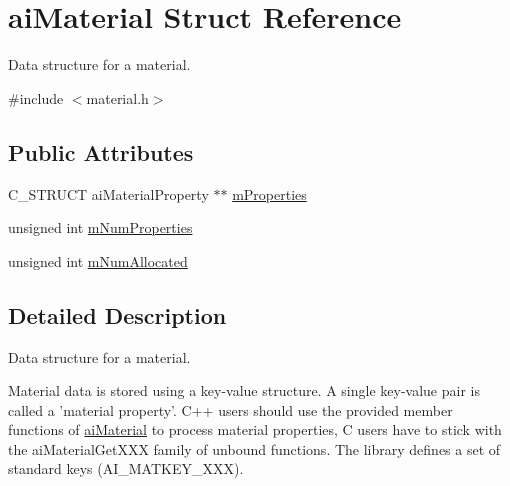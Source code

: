 \hypertarget{structaiMaterial}{\section{ai\-Material \-Struct \-Reference}
\label{structaiMaterial}
}


\-Data structure for a material.  




{\ttfamily \#include $<$material.\-h$>$}

\subsection*{\-Public \-Attributes}
\begin{DoxyCompactItemize}
\item 
\-C\-\_\-\-S\-T\-R\-U\-C\-T ai\-Material\-Property $\ast$$\ast$ \hyperlink{structaiMaterial_af32b125d54bff5bc1fc54a1007487cab}{m\-Properties}
\item 
unsigned int \hyperlink{structaiMaterial_a243b07afdc6507f8878c93a2cafe4963}{m\-Num\-Properties}
\item 
unsigned int \hyperlink{structaiMaterial_a84a0016a263362c52b27a9d8d76dc449}{m\-Num\-Allocated}
\end{DoxyCompactItemize}


\subsection{\-Detailed \-Description}
\-Data structure for a material. 

\-Material data is stored using a key-\/value structure. \-A single key-\/value pair is called a 'material property'. \-C++ users should use the provided member functions of \hyperlink{structaiMaterial}{ai\-Material} to process material properties, \-C users have to stick with the ai\-Material\-Get\-X\-X\-X family of unbound functions. \-The library defines a set of standard keys (\-A\-I\-\_\-\-M\-A\-T\-K\-E\-Y\-\_\-\-X\-X\-X). 


